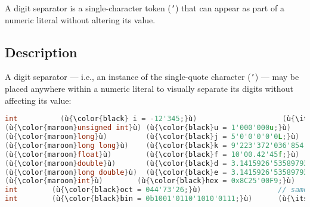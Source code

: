 

A digit separator is a single-character token (\texttt{'}) that can appear as part of a
numeric literal without altering its value.

\subsection[Description]{Description}\label{description}

A digit separator --- i.e., an instance of the single-quote
character (\texttt{'}) --- may be placed anywhere within a numeric
literal to visually separate its digits without affecting its value:


\begin{lstlisting}[language=C++]
int          (ù{\color{black} i = -12'345;}ù)                    (ù{\itshape\color{skyblue}// same as}ù) (ù{\codeincomments{-12345}}ù)
(ù{\color{maroon}unsigned int}ù) (ù{\color{black}u = 1'000'000u;}ù)                 (ù{\itshape\color{skyblue}// same as}ù) (ù{\codeincomments{1000000u}}ù)
(ù{\color{maroon}long}ù)         (ù{\color{black}j = 5'0'0'0'0'0L;}ù)               // same as (ù{\codeincomments{500000L}}ù)
(ù{\color{maroon}long long}ù)    (ù{\color{black}k = 9'223'372'036'854'775'807;}ù)  // same as (ù{\codeincomments{9223372036854775807}}ù)
(ù{\color{maroon}float}ù)        (ù{\color{black}f = 10'00.42'45f;}ù)               // same as (ù{\codeincomments{1000.4245f}}ù)
(ù{\color{maroon}double}ù)       (ù{\color{black}d = 3.1415926'53589793;}ù)         (ù{\itshape\color{skyblue}// same as}ù) (ù{\codeincomments{3.141592653589793}}ù)
(ù{\color{maroon}long double}ù)  (ù{\color{black}e = 3.1415926'53589793'23846;}ù)   (ù{\itshape\color{skyblue}// same as}ù) (ù{\codeincomments{3.14159265358979323846}}ù)
(ù{\color{maroon}int}ù)        (ù{\color{black}hex = 0x8C25'00F9;}ù)                // same as (ù{\codeincomments{0x8C2500F9}}ù)
int        (ù{\color{black}oct = 044'73'26;}ù)                  // same as (ù{\codeincomments{0447326}}ù)
int        (ù{\color{black}bin = 0b1001'0110'1010'0111;}ù)      (ù{\itshape\color{skyblue}// same as}ù) (ù{\codeincomments{0b1001011000110001}}ù)
\end{lstlisting}
    

